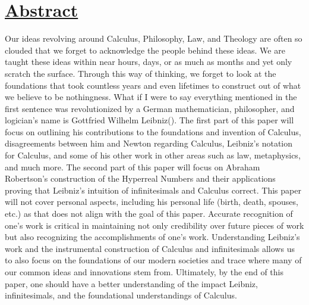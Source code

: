 \documentclass[12pt]{report}
\begin{document}

    \newpage
{}
    \newpage



\section*{\underline{Abstract}}
Our ideas revolving around Calculus, Philosophy, Law, and Theology are often so clouded that we forget to acknowledge the people behind these ideas.
We are taught these ideas within near hours, days, or as much as months and yet only scratch the surface.
Through this way of thinking, we forget to look at the foundations that took countless years and even lifetimes to construct out of what we believe to be nothingness.
What if I were to say everything mentioned in the first sentence was revolutionized by a German mathematician, philosopher, and logician's name is Gottfried Wilhelm Leibniz().
The first part of this paper will focus on outlining his contributions to the foundations and invention of Calculus, disagreements between him and Newton regarding Calculus, Leibniz's notation for Calculus, and some of his other work in other areas such as law, metaphysics, and much more.
The second part of this paper will focus on Abraham Robertson's construction of the Hyperreal Numbers and their applications proving that Leibniz's intuition of infinitesimals and Calculus correct.
This paper will not cover personal aspects, including his personal life (birth, death, spouses, etc.) as that does not align with the goal of this paper.
Accurate recognition of one's work is critical in maintaining not only credibility over future pieces of work but also recognizing the accomplishments of one's work.
Understanding Leibniz's work and the instrumental construction of Calculus and infinitesimals allows us to also focus on the foundations of our modern societies and trace where many of our common ideas and innovations stem from.
Ultimately, by the end of this paper, one should have a better understanding of the impact Leibniz, infinitesimals, and the foundational understandings of Calculus.
\newpage
\end{document}
